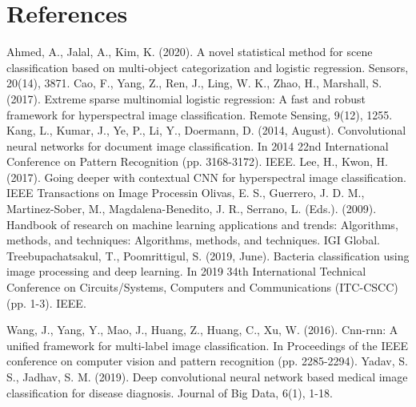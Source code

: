 \documentclass[12pt, letterpaper]{article}
\begin{document}
\section{References}
\medskip
Ahmed, A., Jalal, A.,  Kim, K. (2020). A novel statistical method for scene classification based on multi-object categorization and logistic regression. Sensors, 20(14), 3871.
\medskip
Cao, F., Yang, Z., Ren, J., Ling, W. K., Zhao, H.,  Marshall, S. (2017). Extreme sparse multinomial logistic regression: A fast and robust framework for hyperspectral image classification. Remote Sensing, 9(12), 1255.
\medskip
Kang, L., Kumar, J., Ye, P., Li, Y., Doermann, D. (2014, August). Convolutional neural networks for document image classification. In 2014 22nd International Conference on Pattern Recognition (pp. 3168-3172). IEEE.
\medskip
Lee, H.,  Kwon, H. (2017). Going deeper with contextual CNN for hyperspectral image classification. IEEE Transactions on Image Processin
\medskip
 Olivas, E. S., Guerrero, J. D. M., Martinez-Sober, M., Magdalena-Benedito, J. R.,  Serrano, L. (Eds.). (2009). Handbook of research on machine learning applications and trends: Algorithms, methods, and techniques: Algorithms, methods, and techniques. IGI Global.
 \medskip
Treebupachatsakul, T., Poomrittigul, S. (2019, June). Bacteria classification using image processing and deep learning. In 2019 34th International Technical Conference on Circuits/Systems, Computers and Communications (ITC-CSCC) (pp. 1-3). IEEE.


\medskip
Wang, J., Yang, Y., Mao, J., Huang, Z., Huang, C.,  Xu, W. (2016). Cnn-rnn: A unified framework for multi-label image classification. In Proceedings of the IEEE conference on computer vision and pattern recognition (pp. 2285-2294).
\medskip
Yadav, S. S., Jadhav, S. M. (2019). Deep convolutional neural network based medical image classification for disease diagnosis. Journal of Big Data, 6(1), 1-18.
\end{document}
